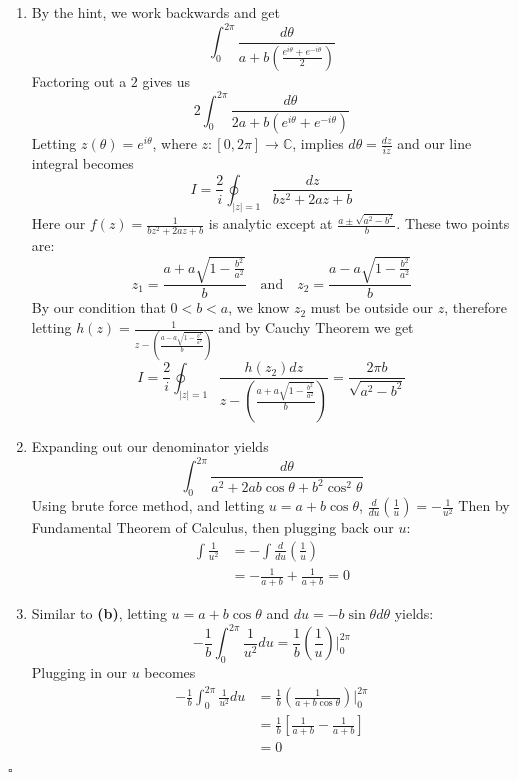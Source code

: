 \documentclass[12pt]{article}
\newcommand{\C}{\mathbb{C}}
\newenvironment{proof}{\noindent{\bf Proof.}}{\hfill $\square$\medskip}
\begin{document}
\begin{proof}
    \begin{enumerate}[label=\textbf{(\alph*)}]
        \item By the hint, we work backwards and get
              $$\int_{0}^{2\pi}\frac{d\theta}{a+b\left(\frac{e^{i\theta}+e^{-i\theta}}{2}\right)}$$
              Factoring out a $2$ gives us
              $$2\int_{0}^{2\pi}\frac{d\theta}{2a+b\left(e^{i\theta}+e^{-i\theta}\right)}$$
              Letting $z(\theta)=e^{i\theta}$, where $z:[0,2\pi]\to\C$, implies
              $d\theta=\frac{dz}{iz}$ and our line integral becomes
              $$I=\frac{2}{i}\oint_{\left|z\right|=1}\frac{dz}{bz^{2}+2az+b}$$ Here
              our $f(z)=\frac{1}{bz^{2}+2az+b}$ is analytic except at
              $\frac{a\pm\sqrt{a^{2}-b^{2}}}{b}$. These two points are:
              $$z_{1}=\frac{a+a\sqrt{1-\frac{b^{2}}{a^{2}}}}{b}\quad\text{and}\quad
                  z_{2}=\frac{a-a\sqrt{1-\frac{b^{2}}{a^{2}}}}{b}$$ By our condition that
              $0<b<a$, we know $z_{2}$ must be outside our $z$, therefore letting
              $h(z)=\frac{1}{z-\left(\frac{a-a\sqrt{1-\frac{b^{2}}{a^{2}}}}{b}\right)}$
              and by Cauchy Theorem we get
              $$I=\frac{2}{i}\oint_{\left|z\right|=1}\frac{h(z_{2})dz}{z-\left(\frac{a+a\sqrt{1-\frac{b^{2}}{a^{2}}}}{b}\right)}=\frac{2\pi
                  b}{\sqrt{a^{2}-b^{2}}}$$
        \item Expanding out our denominator yields
              $$\int_{0}^{2\pi}\frac{d\theta}{a^{2}+2ab\cos\theta+b^{2}\cos^{2}\theta}$$
              Using brute force method, and letting $u=a+b\cos\theta$, $\frac{d}{du}\left(\frac{1}{u}\right)=-\frac{1}{u^{2}}$
              Then by Fundamental Theorem of Calculus, then plugging back our $u$:
              \begin{equation}
                  \begin{split}
                      \int\frac{1}{u^{2}}&=-\int\frac{d}{du}\left(\frac{1}{u}\right)\\
                      &=-\frac{1}{a+b}+\frac{1}{a+b}=0
                  \end{split}
              \end{equation}
        \item Similar to \textbf{(b)}, letting $u=a+b\cos\theta$ and $du=-b\sin\theta d\theta$ yields:
              $$-\frac{1}{b}\int_{0}^{2\pi}\frac{1}{u^{2}}du=\frac{1}{b}\left(\frac{1}{u}\right)\bigg\vert_{0}^{2\pi}$$
              Plugging in our $u$ becomes
              \begin{equation}
                  \begin{split}
                      -\frac{1}{b}\int_{0}^{2\pi}\frac{1}{u^{2}}du&=\frac{1}{b}\left(\frac{1}{a+b\cos\theta}\right)\bigg\vert_{0}^{2\pi}\\
                      &=\frac{1}{b}\left[\frac{1}{a+b}-\frac{1}{a+b}\right]\\
                      &=0
                  \end{split}
              \end{equation}
    \end{enumerate}
\end{proof}
\end{document}
